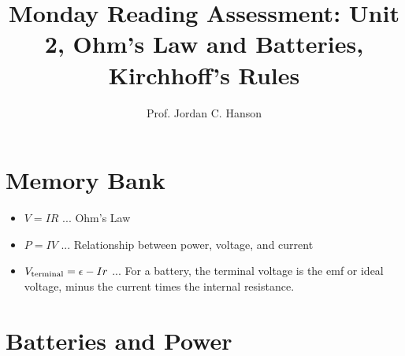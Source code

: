 \documentclass{article}
\begin{document}
\title{Monday Reading Assessment: Unit 2, Ohm's Law and Batteries, Kirchhoff's Rules}
\author{Prof. Jordan C. Hanson}

\maketitle

\section{Memory Bank}

\begin{itemize}
\item $V = IR$ ... Ohm's Law
\item $P = IV$ ... Relationship between power, voltage, and current
\item $V_{\rm terminal} = \epsilon - Ir$ ... For a battery, the terminal voltage is the emf or ideal voltage, minus the current times the internal resistance.
\end{itemize}

\section{Batteries and Power}
\end{document}

